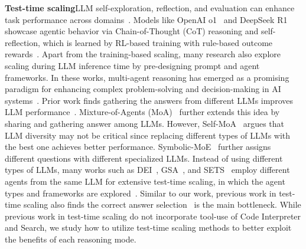 \textbf{Test-time scaling}\quad LLM self-exploration, reflection, and evaluation can enhance task performance across domains~\citep{yang2022re3, welleck2022generating, madaan2023self}. Models like OpenAI o1~\citep{O1-model} and DeepSeek R1~\citep{deepseek-r1} showcase agentic behavior via Chain-of-Thought (CoT) reasoning and self-reflection, which is learned by RL-based training with rule-based outcome rewards~\citep{deepseekmath,SWE-RL}. Apart from the training-based scaling, many research also explore scaling during LLM inference time by pre-designing prompt and agent frameworks. In these works, multi-agent reasoning has emerged as a promising paradigm for enhancing complex problem-solving and decision-making in AI systems~\citep{autogen,camel,langchain}. Prior work finds gathering the answers from different LLMs improves LLM performance~\citep{yilun-LLM-debate-improving}. Mixture-of-Agents (MoA)~\citep{MOA} further extends this idea by sharing and gathering answer among LLMs. However, Self-MoA~\citep{rethink-MOA} argues that LLM diversity may not be critical since replacing different types of LLMs with the best one achieves better performance. Symbolic-MoE~\citep{symbolic-MOE} further assigns different questions with different specialized LLMs. Instead of using different types of LLMs, many works such as DEI~\citep{DEI}, GSA~\citep{GSA:Llms-aggregating-own-responses}, and SETS~\citep{chen2025sets} employ different agents from the same LLM for extensive test-time scaling, in which the agent types and frameworks are explored~\citep{scalable-multi-robot}. Similar to our work, previous work in test-time scaling also finds the correct answer selection~\citep{LLM-monkey} is the main bottleneck. While previous work in test-time scaling do not incorporate tool-use of Code Interpreter and Search, we study how to utilize test-time scaling methods to better exploit the benefits of each reasoning mode.